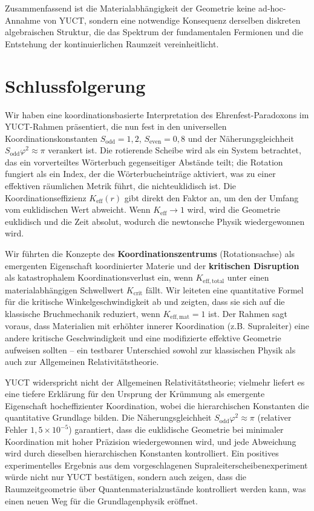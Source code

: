 \documentclass[12pt,a4paper]{article}
\newcommand{\Sodd}{S_{\mathrm{odd}}}
\newcommand{\Seven}{S_{\mathrm{even}}}
\begin{document}
	Zusammenfassend ist die Materialabhängigkeit der Geometrie keine ad‑hoc-Annahme von YUCT, sondern eine notwendige Konsequenz derselben diskreten algebraischen Struktur, die das Spektrum der fundamentalen Fermionen und die Entstehung der kontinuierlichen Raumzeit vereinheitlicht.
	
	\section{Schlussfolgerung}
	\label{sec:conclusion}
	
	Wir haben eine koordinationsbasierte Interpretation des Ehrenfest-Paradoxons im YUCT-Rahmen präsentiert, die nun fest in den universellen Koordinationskonstanten \(\Sodd = 1,2\), \(\Seven = 0,8\) und der Näherungsgleichheit \(\Sodd \varphi^2 \approx \pi\) verankert ist. Die rotierende Scheibe wird als ein System betrachtet, das ein vorverteiltes Wörterbuch gegenseitiger Abstände teilt; die Rotation fungiert als ein Index, der die Wörterbucheinträge aktiviert, was zu einer effektiven räumlichen Metrik führt, die nichteuklidisch ist. Die Koordinationseffizienz \(K_{\mathrm{eff}}(r)\) gibt direkt den Faktor an, um den der Umfang vom euklidischen Wert abweicht. Wenn \(K_{\mathrm{eff}} \to 1\) wird, wird die Geometrie euklidisch und die Zeit absolut, wodurch die newtonsche Physik wiedergewonnen wird.
	
	Wir führten die Konzepte des \textbf{Koordinationszentrums} (Rotationsachse) als emergenten Eigenschaft koordinierter Materie und der \textbf{kritischen Disruption} als katastrophalem Koordinationsverlust ein, wenn \(K_{\mathrm{eff,total}}\) unter einen materialabhängigen Schwellwert \(K_{\mathrm{crit}}\) fällt. Wir leiteten eine quantitative Formel für die kritische Winkelgeschwindigkeit ab und zeigten, dass sie sich auf die klassische Bruchmechanik reduziert, wenn \(K_{\mathrm{eff,mat}}=1\) ist. Der Rahmen sagt voraus, dass Materialien mit erhöhter innerer Koordination (z.B. Supraleiter) eine andere kritische Geschwindigkeit und eine modifizierte effektive Geometrie aufweisen sollten – ein testbarer Unterschied sowohl zur klassischen Physik als auch zur Allgemeinen Relativitätstheorie.
	
	YUCT widerspricht nicht der Allgemeinen Relativitätstheorie; vielmehr liefert es eine tiefere Erklärung für den Ursprung der Krümmung als emergente Eigenschaft hocheffizienter Koordination, wobei die hierarchischen Konstanten die quantitative Grundlage bilden. Die Näherungsgleichheit \(\Sodd \varphi^2 \approx \pi\) (relativer Fehler \(1,5\times10^{-5}\)) garantiert, dass die euklidische Geometrie bei minimaler Koordination mit hoher Präzision wiedergewonnen wird, und jede Abweichung wird durch dieselben hierarchischen Konstanten kontrolliert. Ein positives experimentelles Ergebnis aus dem vorgeschlagenen Supraleiterscheibenexperiment würde nicht nur YUCT bestätigen, sondern auch zeigen, dass die Raumzeitgeometrie über Quantenmaterialzustände kontrolliert werden kann, was einen neuen Weg für die Grundlagenphysik eröffnet.
	
\end{document}
